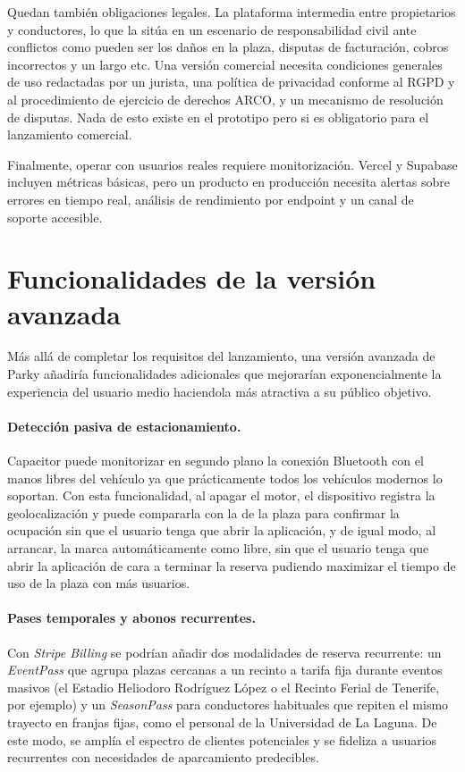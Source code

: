 Quedan también obligaciones legales. La plataforma intermedia entre propietarios y conductores, lo que la sitúa en un escenario de responsabilidad civil ante conflictos como pueden ser los daños en la plaza, disputas de facturación, cobros incorrectos y un largo etc. Una versión comercial necesita condiciones generales de uso redactadas por un jurista, una política de privacidad conforme al RGPD y al procedimiento de ejercicio de derechos ARCO, y un mecanismo de resolución de disputas. Nada de esto existe en el prototipo pero si es obligatorio para el lanzamiento comercial.

Finalmente, operar con usuarios reales requiere monitorización. Vercel y Supabase incluyen métricas básicas, pero un producto en producción necesita alertas sobre errores en tiempo real, análisis de rendimiento por endpoint y un canal de soporte accesible.

\section{Funcionalidades de la versión avanzada}
\label{sec:funcionalidades_adicionales}

Más allá de completar los requisitos del lanzamiento, una versión avanzada de Parky añadiría funcionalidades adicionales que mejorarían exponencialmente la experiencia del usuario medio haciendola más atractiva a su público objetivo.

\paragraph{Detección pasiva de estacionamiento.}
Capacitor puede monitorizar en segundo plano la conexión Bluetooth con el manos libres del vehículo ya que prácticamente todos los vehículos modernos lo soportan. Con esta funcionalidad, al apagar el motor, el dispositivo registra la geolocalización y puede compararla con la de la plaza para confirmar la ocupación sin que el usuario tenga que abrir la aplicación, y de igual modo, al arrancar, la marca automáticamente como libre, sin que el usuario tenga que abrir la aplicación de cara a terminar la reserva pudiendo maximizar el tiempo de uso de la plaza con más usuarios.

\paragraph{Pases temporales y abonos recurrentes.}
Con \textit{Stripe Billing} se podrían añadir dos modalidades de reserva recurrente: un \textit{EventPass} que agrupa plazas cercanas a un recinto a tarifa fija durante eventos masivos (el Estadio Heliodoro Rodríguez López o el Recinto Ferial de Tenerife, por ejemplo) y un \textit{SeasonPass} para conductores habituales que repiten el mismo trayecto en franjas fijas, como el personal de la Universidad de La Laguna. De este modo, se amplía el espectro de clientes potenciales y se fideliza a usuarios recurrentes con necesidades de aparcamiento predecibles.

